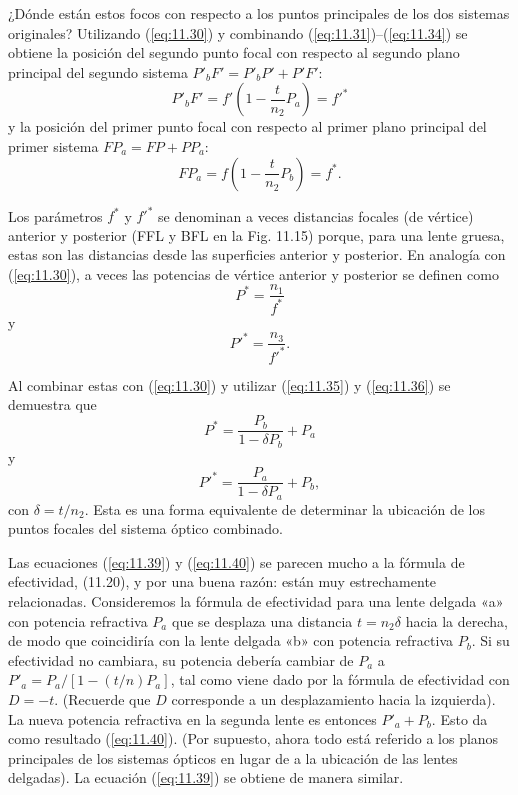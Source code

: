 \documentclass[12pt]{book}
\begin{document}
¿Dónde están estos focos con respecto a los puntos principales de los dos sistemas originales? Utilizando (\ref{eq:11.30}) y combinando (\ref{eq:11.31})--(\ref{eq:11.34}) se obtiene la posición del segundo punto focal con respecto al segundo plano principal del segundo sistema $P'_b F' = P'_b P' + P' F'$:
\begin{equation}
\label{eq:11.35}
P'_b F' = f' \left( 1 - \frac{t}{n_2} P_a \right) = f'^*
\end{equation}
y la posición del primer punto focal con respecto al primer plano principal del primer sistema $F P_a = FP + P P_a$:
\begin{equation}
\label{eq:11.36}
F P_a = f \left( 1 - \frac{t}{n_2} P_b \right) = f^*.
\end{equation}

Los parámetros $f^*$ y $f'^*$ se denominan a veces distancias focales (de vértice) anterior y posterior (FFL y BFL en la Fig. 11.15) porque, para una lente gruesa, estas son las distancias desde las superficies anterior y posterior. En analogía con (\ref{eq:11.30}), a veces las potencias de vértice anterior y posterior se definen como
\begin{equation}
\label{eq:11.37}
P^* = \frac{n_1}{f^*}
\end{equation}
y
\begin{equation}
\label{eq:11.38}
P'^* = \frac{n_3}{f'^*} .
\end{equation}

Al combinar estas con (\ref{eq:11.30}) y utilizar (\ref{eq:11.35}) y (\ref{eq:11.36}) se demuestra que
\begin{equation}
\label{eq:11.39}
P^* = \frac{P_b}{1 - \delta P_b} + P_a
\end{equation}
y
\begin{equation}
\label{eq:11.40}
P'^* = \frac{P_a}{1 - \delta P_a} + P_b,
\end{equation}
con $\delta = t/n_2$. Esta es una forma equivalente de determinar la ubicación de los puntos focales del sistema óptico combinado.

Las ecuaciones (\ref{eq:11.39}) y (\ref{eq:11.40}) se parecen mucho a la fórmula de efectividad, (11.20), y por una buena razón: están muy estrechamente relacionadas. Consideremos la fórmula de efectividad para una lente delgada «a» con potencia refractiva $P_a$ que se desplaza una distancia $t = n_2 \delta$ hacia la derecha, de modo que coincidiría con la lente delgada «b» con potencia refractiva $P_b$. Si su efectividad no cambiara, su potencia debería cambiar de $P_a$ a $P'_a = P_a/[1 - (t/n)P_a]$, tal como viene dado por la fórmula de efectividad con $D = -t$. (Recuerde que $D$ corresponde a un desplazamiento hacia la izquierda). La nueva potencia refractiva en la segunda lente es entonces $P'_a + P_b$. Esto da como resultado (\ref{eq:11.40}). (Por supuesto, ahora todo está referido a los planos principales de los sistemas ópticos en lugar de a la ubicación de las lentes delgadas). La ecuación (\ref{eq:11.39}) se obtiene de manera similar.
\end{document}
